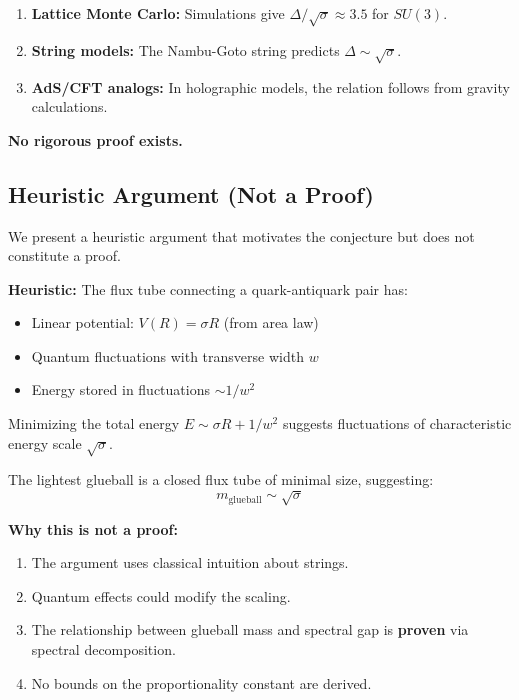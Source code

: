 \begin{remark}
\begin{enumerate}
    \item \textbf{Lattice Monte Carlo:} Simulations give $\Delta/\sqrt{\sigma} \approx 3.5$ for $SU(3)$.
    \item \textbf{String models:} The Nambu-Goto string predicts $\Delta \sim \sqrt{\sigma}$.
    \item \textbf{AdS/CFT analogs:} In holographic models, the relation follows from gravity calculations.
\end{enumerate}

\textbf{No rigorous proof exists.}
\end{remark}

\subsection{Heuristic Argument (Not a Proof)}

We present a heuristic argument that motivates the conjecture but does not constitute a proof.

\textbf{Heuristic:} The flux tube connecting a quark-antiquark pair has:
\begin{itemize}
    \item Linear potential: $V(R) = \sigma R$ (from area law)
    \item Quantum fluctuations with transverse width $w$
    \item Energy stored in fluctuations $\sim 1/w^2$
\end{itemize}

Minimizing the total energy $E \sim \sigma R + 1/w^2$ suggests fluctuations of characteristic energy scale $\sqrt{\sigma}$.

The lightest glueball is a closed flux tube of minimal size, suggesting:
\[
m_{\text{glueball}} \sim \sqrt{\sigma}
\]

\textbf{Why this is not a proof:}
\begin{enumerate}
    \item The argument uses classical intuition about strings.
    \item Quantum effects could modify the scaling.
    \item The relationship between glueball mass and spectral gap is \textbf{proven} via spectral decomposition.
    \item No bounds on the proportionality constant are derived.
\end{enumerate}

